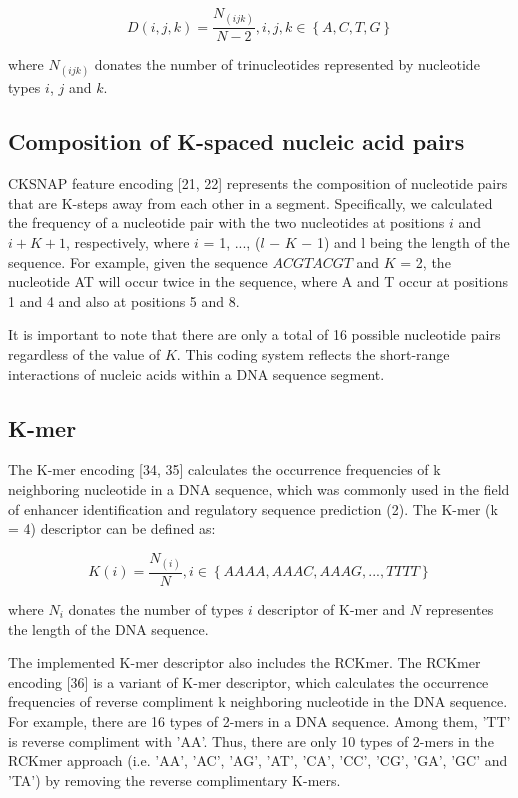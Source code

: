 \begin{equation}\label{eq:TNC}
    D(i,j,k) = \frac{N_{(ijk)}}{N-2}, i,j,k \in \left\{A,C,T,G\right\}
\end{equation}

where $N_{(ijk)}$ donates the number of trinucleotides represented by nucleotide types $i$, $j$ and $k$.


\subsection{Composition of K-spaced nucleic acid pairs}

\gls{CKSNAP} feature encoding [21, 22] represents the composition of nucleotide pairs that are K-steps away from each other in a segment. Specifically, we calculated the frequency of a nucleotide pair with the two nucleotides at positions $i$ and $i + K + 1$, respectively, where $i$ = 1, ..., ($l$ − $K$ − 1) and l being the length of the sequence. For example, given the sequence $ACGTACGT$ and $K$ = 2, the nucleotide AT will occur twice in the sequence, where A and T occur at positions 1 and 4 and also at positions 5 and 8. 

It is important to note that there are only a total of 16 possible nucleotide pairs regardless of the value of $K$. This coding system reflects the short-range interactions of nucleic acids within a \gls{DNA} sequence segment.

\subsection{K-mer}

The K-mer encoding [34, 35] calculates the occurrence frequencies of k neighboring nucleotide in a \gls{DNA} sequence, which was commonly used in the field of enhancer identification and regulatory sequence prediction (2). The K-mer (k = 4) descriptor can be defined as:

\begin{equation}\label{eq:K-mer}
    K(i) = \frac{N_{(i)}}{N}, i \in \left\{AAAA, AAAC, AAAG,...,TTTT\right\}
\end{equation}

where $N_{i}$ donates the number of types $i$ descriptor of K-mer and $N$ representes the length of the DNA sequence.

The implemented K-mer descriptor also includes the \gls{RCKmer}. The \gls{RCKmer} encoding [36] is a variant of K-mer descriptor, which calculates the occurrence frequencies of reverse compliment k neighboring nucleotide in the \gls{DNA} sequence. For example, there are 16 types of 2-mers in a \gls{DNA} sequence. Among them, 'TT' is reverse compliment with 'AA'. Thus, there are only 10 types of 2-mers in the \gls{RCKmer} approach (i.e. 'AA', 'AC', 'AG', 'AT', 'CA', 'CC', 'CG', 'GA', 'GC' and 'TA') by removing the reverse complimentary K-mers.

